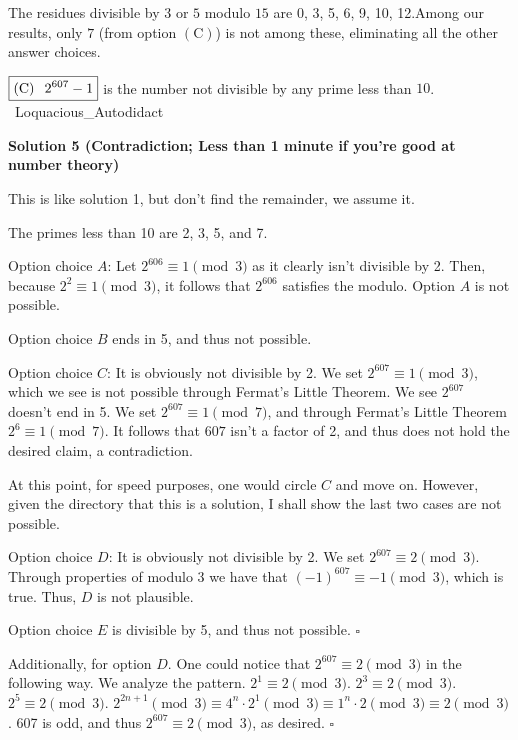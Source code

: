 \begin{enumerate}
 The residues divisible by $3$ or $5$ modulo $15$ are 0, 3, 5, 6, 9, 10, 12.Among our results, only $7$ (from option $\boxed{(\text{C})}$) is not among these, eliminating all the other answer choices.

 
$\boxed{(\text{C}) \hspace{0.1in} 2^{607}-1}$ is the number not divisible by any prime less than $10$. \\~Loquacious\_Autodidact

 



\textbf{Solution 5 (Contradiction; Less than 1 minute if you're good at number theory)}

This is like solution 1, but don't find the remainder, we assume it.

 The primes less than 10 are 2, 3, 5, and 7.

 Option choice $A$: Let $2^{606} \equiv 1 \pmod{3}$ as it clearly isn't divisible by 2. Then, because $2^2 \equiv 1 \pmod{3}$, it follows that $2^{606}$ satisfies the modulo. Option $A$ is not possible.

 Option choice $B$ ends in 5, and thus not possible.

 Option choice $C$: It is obviously not divisible by 2. We set $2^{607} \equiv 1 \pmod{3}$, which we see is not possible through Fermat's Little Theorem. We see $2^{607}$ doesn't end in 5. We set $2^{607} \equiv 1 \pmod{7}$, and through Fermat's Little Theorem $2^6 \equiv 1 \pmod{7}$. It follows that $607$ isn't a factor of 2, and thus does not hold the desired claim, a contradiction.

 At this point, for speed purposes, one would circle $C$ and move on. However, given the directory that this is a solution, I shall show the last two cases are not possible.

 Option choice $D$: It is obviously not divisible by 2. We set $2^{607} \equiv 2 \pmod{3}$. Through properties of modulo 3 we have that $(-1)^{607} \equiv -1 \pmod{3}$, which is true. Thus, $D$ is not plausible.

 Option choice $E$ is divisible by 5, and thus not possible. $\square$

 Additionally, for option $D$. One could notice that $2^{607} \equiv 2 \pmod{3}$ in the following way. We analyze the pattern. $2^1 \equiv 2 \pmod{3}$. $2^3 \equiv 2 \pmod{3}$. $2^5 \equiv 2 \pmod{3}$. $2^{2n+1} \pmod{3} \equiv 4^n \cdot 2^1 \pmod{3} \equiv 1^n \cdot 2 \pmod{3} \equiv 2 \pmod{3}$. 607 is odd, and thus $2^{607} \equiv 2 \pmod{3}$, as desired. $\square$





\end{enumerate}
